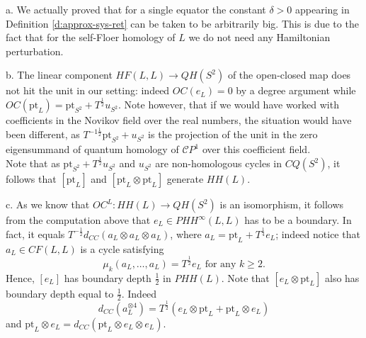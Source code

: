 \begin{rem}
a. We actually proved that for a single equator the constant $\delta>0$ appearing in Definition \ref{d:approx-sys-ret} can be taken to be arbitrarily big. This is due to the fact that for the self-Floer homology of $L$ we do not need any Hamiltonian perturbation.

b. The linear component $ HF(L,L)\to QH(S^2)$ of the open-closed map does not hit the unit in our setting: indeed $OC(e_L)=0$ by a degree argument while $OC(\text{pt}_L) = \text{pt}_{S^2}+T^{\frac{1}{2}}u_{S^2}$. Note however, that if we would have worked with coefficients in the Novikov field over the real numbers, the situation would have been different, as $T^{-1\frac{1}{2}}\text{pt}_{S^2}+u_{S^2}$ is the projection of the unit in the zero eigensummand of quantum homology of $\mathcal{C}P^1$ over this coefficient field.\\ Note that as $\text{pt}_{S^2}+T^{\frac{1}{2}}u_{S^2}$ and $u_{S^2}$ are non-homologous cycles in $CQ(S^2)$, it follows that $[\text{pt}_{L}]$ and $[\text{pt}_{L}\otimes \text{pt}_{L}]$ generate $HH(L)$.

c. As we know that $OC^L\colon HH(L)\to QH(S^2)$ is an isomorphism, it follows from the computation above that $e_L\in PHH^\infty(L,L)$ has to be a boundary. In fact, it equals $T^{-\frac{1}{2}}d_{CC}(a_L\otimes a_L\otimes a_L)$, where $a_L = \text{pt}_L+T^{\frac{1}{4}}e_L$; indeed notice that $a_L\in CF(L,L)$ is a cycle satisfying $$\mu_k(a_L,\ldots, a_L) =T^{\frac{1}{2}}e_L \text{  for any }k\geq 2.$$
Hence, $[e_L]$ has boundary depth $\frac{1}{2}$ in $PHH(L)$. Note that $[e_L\otimes \text{pt}_L]$ also has boundary depth equal to $\frac 12$. Indeed $$d_{CC}(a_L^{\otimes 4}) = T^{\frac{1}{2}}(e_L\otimes \text{pt}_L + \text{pt}_L\otimes e_L)$$ and $\text{pt}_L\otimes e_L = d_{CC}(\text{pt}_L\otimes e_L\otimes e_L)$.%
\end{rem}

